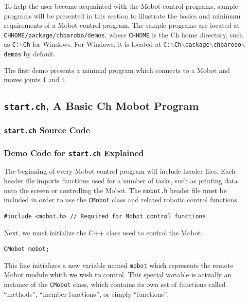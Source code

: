 \documentclass{article}
\begin{document}
To help the user become acquainted with the Mobot control programs, sample
programs will be presented in this section to illustrate the basics and minimum requirements of
a Mobot control program. The sample programs are located at
\texttt{CHHOME/package/chbarobo/demos}, where \texttt{CHHOME} is the
Ch home directory, such as \texttt{C:$\backslash$Ch} for Windows. For Windows,
it is located at \texttt{C:$\backslash$Ch$\backslash$package$\backslash$chbarobo$\backslash$demos} by default.

The first demo presents a minimal program which connects to a Mobot and
moves joints 1 and 4.

\subsection{\texttt{start.ch}, A Basic Ch Mobot Program}
\subsubsection{\texttt{start.ch} Source Code}


\subsubsection{\label{sec:democode}Demo Code for \texttt{start.ch} Explained}
The beginning of every Mobot control program will include header files. Each
header file imports functions used for a number of tasks, such as printing
data onto the screen or controlling the Mobot. The \texttt{mobot.h} header
file must be included in order to use the \texttt{CMobot} class and related
robotic control functions.

\begin{verbatim}
#include <mobot.h> // Required for Mobot control functions
\end{verbatim}

Next, we must initialize the C++ class used to control the Mobot. 

\begin{verbatim}
CMobot mobot;
\end{verbatim}

This line
initializes a new variable named \texttt{mobot} which represents the remote
Mobot module which we wish to control. This special variable is actually an
instance of the \texttt{CMobot} class, which contains its own set of
functions called ``methods'', ``member functions'', or simply ``functions''.
\end{document}
